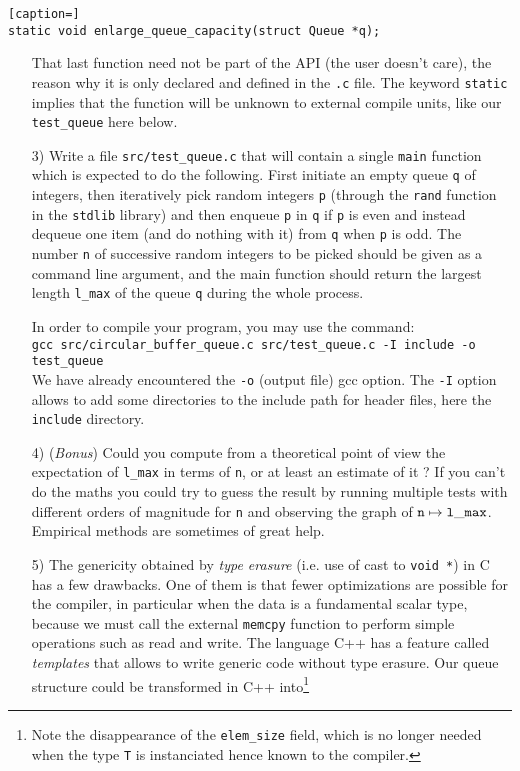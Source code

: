 \documentclass[a4paper,12pt]{article}
\begin{document}
\begin{lstlisting}[caption=]
static void enlarge_queue_capacity(struct Queue *q);
\end{lstlisting}
\begin{enumerate}
\item[] That last function need not be part of the API (the user doesn't care), the reason why it is only declared and defined in the {\tt .c} file. The keyword {\tt static} implies that the function will be unknown to external compile units, like our {\tt test\_queue} here below.

\item[3)]  Write a file {\tt src/test\_queue.c} that will contain a single {\tt main} function which is expected to do the following. First initiate an empty queue {\tt q} of integers, then iteratively pick random integers {\tt p} (through the {\tt rand} function in the {\tt stdlib} library) and then enqueue {\tt p} in {\tt q} if {\tt p} is even and  instead dequeue one item (and do nothing with it) from {\tt q} when {\tt p} is odd. The number {\tt n} of successive random integers to be picked should be given as a command line argument, and the main function should return the largest length {\tt l\_max} of the queue {\tt q} during the whole process.

In order to compile your program, you may use the command:\\
{\tt gcc src/circular\_buffer\_queue.c src/test\_queue.c -I include -o test\_queue}\\
We have already encountered the {\tt -o} (output file) gcc option. The {\tt -I} option allows to add some directories to the include path for header files, here the {\tt include} directory.

\item[4)] ({\it Bonus}) Could you compute from a theoretical point of view the expectation of {\tt l\_max} in terms of {\tt n}, or at least an estimate of it ? If you can't do the maths you could try to guess the result by running multiple tests with different orders of magnitude for {\tt n} and observing the graph of ${\tt n} \mapsto {\tt l\_max}$. Empirical methods are sometimes of great help.

\item[5)] The genericity obtained by {\it type erasure} (i.e. use of cast to {\tt void *}) in C has a few drawbacks. One of them is that fewer optimizations are possible for the compiler, in particular when the data is a fundamental scalar type, because we must call the external {\tt memcpy} function to perform simple operations such as read and write. The language C++ has a feature called {\it templates} that allows to write generic code without type erasure. Our queue structure could be transformed in C++ into\footnote{Note the disappearance of the {\tt elem\_size} field, which is no longer needed when the type {\tt T} is instanciated hence known to the compiler.} 
\end{enumerate}
\end{document}
